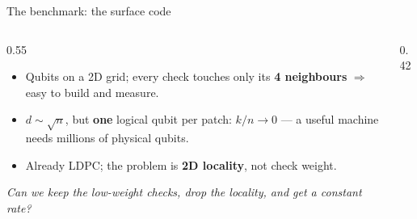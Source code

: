 \documentclass[11pt,aspectratio=169]{beamer}
\begin{document}
\begin{frame}{The benchmark: the surface code}
  \begin{columns}[T]
    \begin{column}{0.55\textwidth}
      \begin{itemize}\setlength{\itemsep}{8pt}
        \item Qubits on a 2D grid; every check touches only its
              \textbf{4 neighbours} $\Rightarrow$ easy to build and measure.
        \item $d \sim \sqrt{n}$, but \textbf{one} logical qubit per patch:
              $k/n \to 0$ --- a useful machine needs millions of physical
              qubits.
        \item Already LDPC; the problem is \textbf{2D locality},
              not check weight.
      \end{itemize}
      \medskip
      \emph{Can we keep the low-weight checks, drop the locality, and get a
      constant rate?}
    \end{column}
    \begin{column}{0.42\textwidth}
      \centering
    \end{column}
  \end{columns}
\end{frame}
\end{document}
